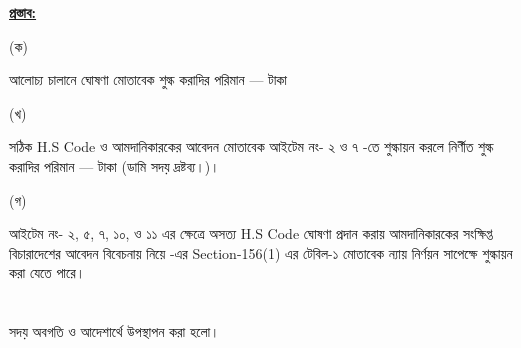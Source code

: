 \documentclass[12pt]{article}
\begin{document}
\begin{minipage}[t]{0.95\linewidth}
\underline{\textbf{প্রস্তাব:}}
\end{minipage}
\begin{minipage}[t]{0.05\linewidth}
\hspace{1em}
\end{minipage}
\begin{minipage}[t]{0.05\linewidth}
(ক)
\end{minipage}
\begin{minipage}[t]{0.90\linewidth}
আলোচ্য চালানে ঘোষণা মোতাবেক শুল্ক করাদির পরিমান
--- টাকা
\end{minipage}
\begin{minipage}[t]{0.05\linewidth}
\hspace{1em}
\end{minipage}
\begin{minipage}[t]{0.05\linewidth}
(খ)
\end{minipage}
\begin{minipage}[t]{0.90\linewidth}
সঠিক H.S Code ও আমদানিকারকের আবেদন
মোতাবেক আইটেম নং- ২ ও ৭ {\cpcofs} -তে
শুল্কায়ন করলে নির্ণীত শুল্ক করাদির পরিমান
--- টাকা (ডামি সদয় দ্রষ্টব্য।)।
\end{minipage}
\begin{minipage}[t]{0.05\linewidth}
\hspace{1em}
\end{minipage}
\begin{minipage}[t]{0.05\linewidth}
(গ)
\end{minipage}
\begin{minipage}[t]{0.90\linewidth}
আইটেম নং-  ২, ৫, ৭, ১০, ও ১১ এর
ক্ষেত্রে অসত্য H.S Code ঘোষণা প্রদান করায়
আমদানিকারকের সংক্ষিপ্ত বিচারাদেশের আবেদন
বিবেচনায় নিয়ে {\tca} -এর Section-156(1) এর
টেবিল-১ মোতাবেক ন্যায় নির্ণয়ন সাপেক্ষে শুল্কায়ন করা
যেতে পারে।
\\
\\
\\
\normalsize
সদয় অবগতি ও আদেশার্থে উপস্থাপন করা
হলো।
\end{minipage}
\end{document}
